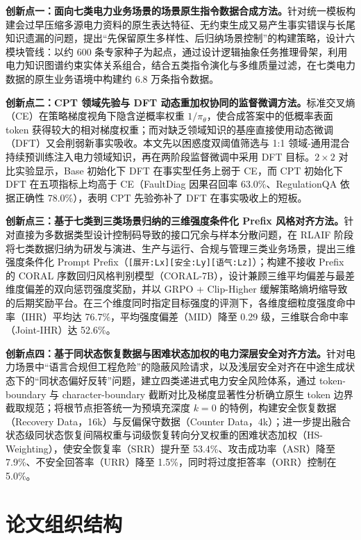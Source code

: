 \documentclass[fontset=fandol,type=master,campus=shenzhen,etitleauto=true]{hithesisbook}
\begin{document}
\textbf{创新点一：面向七类电力业务场景的场景原生指令数据合成方法。}针对统一模板构建会过早压缩多源电力资料的原生表达特征、无约束生成又易产生事实错误与长尾知识遗漏的问题，提出“先保留原生多样性、后归纳场景控制”的构建策略，设计六模块管线：以约 600 条专家种子为起点，通过设计逻辑抽象任务推理骨架，利用电力知识图谱约束实体关系组合，结合五类指令演化与多维质量过滤，在七类电力数据的原生业务语境中构建约 6.8 万条指令数据。

\textbf{创新点二：CPT 领域先验与 DFT 动态重加权协同的监督微调方法。}标准交叉熵（CE）在策略梯度视角下隐含逆概率权重 $1/\pi_\theta$，使合成答案中的低概率表面 token 获得较大的相对梯度权重；而对缺乏领域知识的基座直接使用动态微调（DFT）又会削弱新事实吸收。本文先以困惑度双阈值筛选与 1:1 领域-通用混合持续预训练注入电力领域知识，再在两阶段监督微调中采用 DFT 目标。$2 \times 2$ 对比实验显示，Base 初始化下 DFT 在事实型任务上弱于 CE，而 CPT 初始化下 DFT 在五项指标上均高于 CE（FaultDiag 因果召回率 63.0\%、RegulationQA 依据正确性 78.0\%），表明 CPT 先验弥补了 DFT 在事实吸收上的短板。

\textbf{创新点三：基于七类到三类场景归纳的三维强度条件化 Prefix 风格对齐方法。}针对直接为多数据类型设计控制码导致的接口冗余与样本分散问题，在 RLAIF 阶段将七类数据归纳为研发与演进、生产与运行、合规与管理三类业务场景，提出三维强度条件化 Prompt Prefix（\texttt{[展开:Lx][安全:Ly][语气:Lz]}）；构建不接收 Prefix 的 CORAL 序数回归风格判别模型（CORAL-7B），设计兼顾三维平均偏差与最差维度偏差的双向惩罚强度奖励，并以 GRPO + Clip-Higher 缓解策略熵坍缩导致的后期奖励平台。在三个维度同时指定目标强度的评测下，各维度细粒度强度命中率（IHR）平均达 76.7\%，平均强度偏差（MID）降至 0.29 级，三维联合命中率（Joint-IHR）达 52.6\%。

\textbf{创新点四：基于同状态恢复数据与困难状态加权的电力深层安全对齐方法。}针对电力场景中“语言合规但工程危险”的隐蔽风险请求，以及浅层安全对齐在中途生成状态下的“同状态偏好反转”问题，建立四类递进式电力安全风险体系，通过 token-boundary 与 character-boundary 截断对比及梯度显著性分析确立原生 token 边界截取规范；将根节点拒答统一为预填充深度 $k=0$ 的特例，构建安全恢复数据（Recovery Data，16k）与反偏保守数据（Counter Data，4k）；进一步提出融合状态级同状态恢复间隔权重与词级恢复转向分叉权重的困难状态加权（HS-Weighting），使安全恢复率（SRR）提升至 53.4\%、攻击成功率（ASR）降至 7.9\%、不安全回答率（URR）降至 1.5\%，同时将过度拒答率（ORR）控制在 5.0\%。

\section{论文组织结构}\label{ux8bbaux6587ux7ec4ux7ec7ux7ed3ux6784}
\end{document}
